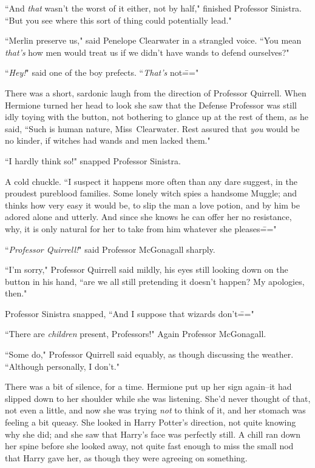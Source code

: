``And \emph{that} wasn't the worst of it either, not by half," finished Professor Sinistra. ``But you see where this sort of thing could potentially lead."

``Merlin preserve us," said Penelope Clearwater in a strangled voice. ``You mean \emph{that's} how men would treat us if we didn't have wands to defend ourselves?"

``\emph{Hey!}" said one of the boy prefects. ``\emph{That's} not\==="

There was a short, sardonic laugh from the direction of Professor Quirrell. When Hermione turned her head to look she saw that the Defense Professor was still idly toying with the button, not bothering to glance up at the rest of them, as he said, ``Such is human nature, Miss~Clearwater. Rest assured that \emph{you} would be no kinder, if witches had wands and men lacked them."

``I hardly think so!" snapped Professor Sinistra.

A cold chuckle. ``I suspect it happens more often than any dare suggest, in the proudest pureblood families. Some lonely witch spies a handsome Muggle; and thinks how very easy it would be, to slip the man a love potion, and by him be adored alone and utterly. And since she knows he can offer her no resistance, why, it is only natural for her to take from him whatever she pleases\==="

``\emph{Professor Quirrell!}" said Professor McGonagall sharply.

``I'm sorry," Professor Quirrell said mildly, his eyes still looking down on the button in his hand, ``are we all still pretending it doesn't happen? My apologies, then."

Professor Sinistra snapped, ``And I suppose that wizards don't\==="

``There are \emph{children} present, Professors!" Again Professor McGonagall.

``Some do," Professor Quirrell said equably, as though discussing the weather. ``Although personally, I don't."

There was a bit of silence, for a time. Hermione put up her sign again\---it had slipped down to her shoulder while she was listening. She'd never thought of that, not even a little, and now she was trying \emph{not} to think of it, and her stomach was feeling a bit queasy. She looked in Harry Potter's direction, not quite knowing why she did; and she saw that Harry's face was perfectly still. A chill ran down her spine before she looked away, not quite fast enough to miss the small nod that Harry gave her, as though they were agreeing on something.


